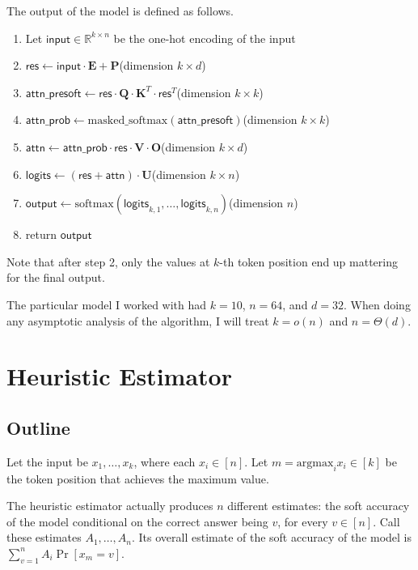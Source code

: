 \documentclass[12pt]{article}
\newcommand{\bP}{\mathbf{P}}
\newcommand{\bE}{\mathbf{E}}
\newcommand{\bQ}{\mathbf{Q}}
\newcommand{\bK}{\mathbf{K}}
\newcommand{\bV}{\mathbf{V}}
\newcommand{\bO}{\mathbf{O}}
\newcommand{\bU}{\mathbf{U}}
\newcommand{\R}{\mathbb{R}}
\newcommand{\aps}{\mathsf{attn\_presoft}}
\begin{document}
The output of the model is defined as follows.
\begin{enumerate}
\item Let $\mathsf{input} \in \R^{k\times n}$ be the one-hot encoding of the input
\item $\mathsf{res} \leftarrow \mathsf{input} \cdot \bE + \bP$\hfill (dimension $k \times d$)
\item $\aps \leftarrow \mathsf{res} \cdot \bQ \cdot \bK^T \cdot \mathsf{res}^T$\hfill (dimension $k \times k$)
\item $\mathsf{attn\_prob} \leftarrow \mathrm{masked\_softmax}(\aps)$\hfill (dimension $k \times k$)
\item $\mathsf{attn} \leftarrow \mathsf{attn\_prob} \cdot \mathsf{res} \cdot \bV \cdot \bO$\hfill (dimension $k \times d$)
\item $\mathsf{logits} \leftarrow (\mathsf{res} + \mathsf{attn}) \cdot \bU$\hfill (dimension $k \times n$)
\item $\mathsf{output} \leftarrow \mathrm{softmax}(\mathsf{logits}_{k,1}, \dots, \mathsf{logits}_{k,n})$\hfill (dimension $n$)
\item return $\mathsf{output}$
\end{enumerate}

Note that after step 2, only the values at $k$-th token position end up mattering for the final output.

The particular model I worked with had $k = 10$, $n = 64$, and $d = 32$. When doing any asymptotic analysis of the algorithm, I will treat $k = o(n)$ and $n = \Theta(d)$.

\section{Heuristic Estimator}

\subsection{Outline}
Let the input be $x_1, \dots, x_k$, where each $x_i \in [n]$. Let $m = \mathrm{argmax}_i x_i \in [k]$ be the token position that achieves the maximum value.

The heuristic estimator actually produces $n$ different estimates: the soft accuracy of the model conditional on the correct answer being $v$, for every $v \in [n]$. Call these estimates $A_1, \dots, A_n$. Its overall estimate of the soft accuracy of the model is $\sum_{v = 1}^n A_i\Pr[x_m = v].$
\end{document}
